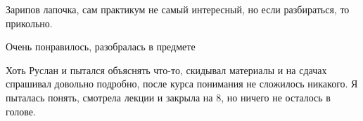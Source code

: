             \begin{commentbox} 
                Зарипов лапочка, сам практикум не самый интересный, но если разбираться, то прикольно. 
            \end{commentbox} 
        
            \begin{commentbox} 
                Очень понравилось, разобралась в предмете 
            \end{commentbox} 
        
            \begin{commentbox} 
                Хоть Руслан и пытался объяснять что-то, скидывал материалы и на сдачах спрашивал довольно подробно, после курса понимания не сложилось никакого. Я пыталась понять, смотрела лекции и закрыла на 8, но ничего не осталось в голове. 
            \end{commentbox} 


